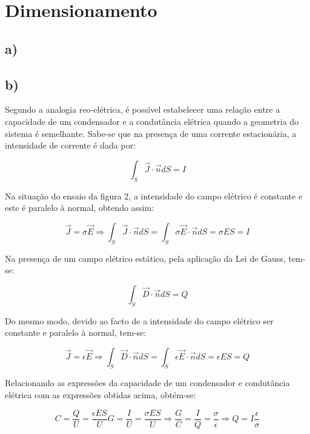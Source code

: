 \documentclass[portuguese, a4paper, titlepage]{article}
\begin{document}
	\section{Dimensionamento}
	\subsection{a)}

	\subsection{b)}
	Segundo a analogia reo-elétrica, é possível estabelecer uma relação entre a capacidade de um condensador e a condutância elétrica quando a geometria do sistema é semelhante.
	Sabe-se que na presença de uma corrente estacionária, a intensidade de corrente é dada por:

	\begin{equation*}
		\int _ { S } \vec{J} \cdot \vec{n} d S = I
	\end{equation*}

	Na situação do ensaio da figura 2, a intensidade do campo elétrico é constante e este é paralelo à normal, obtendo assim:

	\begin{equation*}
		\vec{J} = \sigma \vec{E} \Rightarrow \int _ { S } \vec{J} \cdot \vec{n} d S = \int _ { S } \sigma \vec{E} \cdot \vec{n} d S  = \sigma E S = I
	\end{equation*}

	Na presença de um campo elétrico estático, pela aplicação da Lei de Gauss, tem-se:

	\begin{equation*}
			\int _ { S } \vec{D} \cdot \vec{n} d S = Q
	\end{equation*}

	Do mesmo modo, devido ao facto de a intensidade do campo elétrico ser constante e paralelo à normal, tem-se:

	\begin{equation*}
		\vec{J} = \epsilon \vec{E} \Rightarrow \int _ { S } \vec{D} \cdot \vec{n} d S = \int _ { S } \epsilon \vec{E} \cdot \vec{n} d S = \epsilon E S = Q
	\end{equation*}

	Relacionando as expressões da capacidade de um condensador e condutância elétrica com as expressões obtidas acima, obtém-se:

	\begin{equation*}
		C =  \frac{Q}{U} = \frac{\epsilon E S}{U} G = \frac{I}{U} = \frac{\sigma E S}{U} \Rightarrow \frac{G}{C} = \frac{I}{Q} = \frac{\sigma}{\epsilon} \Rightarrow Q = I\frac{\epsilon}{\sigma}
	\end{equation*}
\end{document}
